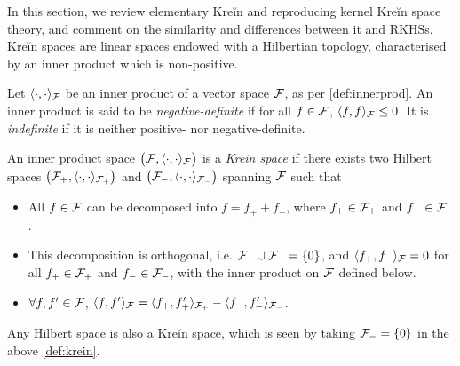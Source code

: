 In this section, we review elementary Kreĭn and reproducing kernel Kreĭn space theory, and comment on the similarity and differences between it and RKHSs.
Kreĭn spaces are linear spaces endowed with a Hilbertian topology, characterised by an inner product which is non-positive.

\begin{definition}
  Let $\langle\cdot,\cdot\rangle_{\mathcal F}$ be an inner product of a vector space ${\mathcal F}$, as per \cref{def:innerprod}.
  An inner product is said to be \emph{negative-definite} if for all $f\in{\mathcal F}$, $\langle f,f\rangle_{\mathcal F} \leq 0$.
  It is \emph{indefinite} if it is neither positive- nor negative-definite.
\end{definition}

\begin{definition}\label{def:krein}
  An inner product space $\big({\mathcal F},\langle\cdot,\cdot\rangle_{\mathcal F}\big)$ is a \emph{Krein space} if there exists two Hilbert spaces $\big({\mathcal F}_+,\langle\cdot,\cdot\rangle_{{\mathcal F}_+}\big)$ and $\big({\mathcal F}_-,\langle\cdot,\cdot\rangle_{{\mathcal F}_-}\big)$ spanning ${\mathcal F}$ such that
  \begin{itemize}
    \item All $f\in{\mathcal F}$ can be decomposed into $f = f_+ + f_-$, where $f_+\in{\mathcal F}_+$ and $f_- \in {\mathcal F}_-$.
    \item This decomposition is orthogonal, i.e. ${\mathcal F}_+ \cup {\mathcal F}_- = \{0\}$, and $\langle f_+,f_-\rangle_{\mathcal F}=0$ for all $f_+\in{\mathcal F}_+$ and $f_-\in{\mathcal F}_-$, with the inner product on ${\mathcal F}$ defined below.
    \item $\forall f,f'\in{\mathcal F}$, $\langle f,f'\rangle_{\mathcal F} = \langle f_+,f_+'\rangle_{{\mathcal F}_+}- \langle f_-,f_-'\rangle_{{\mathcal F}_-}$.
  \end{itemize}
\end{definition}

\begin{remark}
  Any Hilbert space is also a Kreĭn space, which is seen by taking ${\mathcal F}_- = \{0\}$ in the above \cref{def:krein}.
\end{remark}


